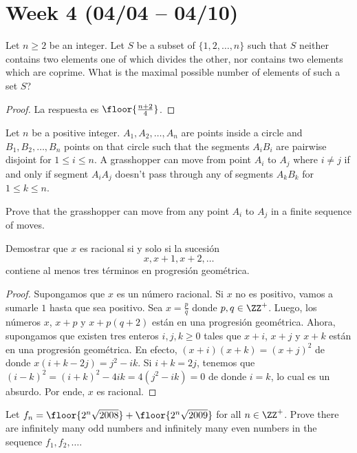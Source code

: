 \section{Week 4 (04/04 -- 04/10)}

\begin{probMR}[Balkan MO 2005/4]
	Let $n\ge 2$ be an integer. Let $S$ be a subset of $\{1,2,\dots,n\}$ such that $S$ neither contains two elements one of which divides the other, nor contains two elements which are coprime. What is the maximal possible number of elements of such a set $S$?
\end{probMR}

\begin{proof}
	La respuesta es $\floor{\frac{n+2}{4}}$.
\end{proof}

\begin{probMB}[Croatian MO 2018/5]
	Let $n$ be a positive integer. $A_1,A_2,\dots,A_n$ are points inside a circle and $B_1,B_2,\dots,B_n$ points on that circle such that the segments $A_iB_i$ are pairwise disjoint for $1\le i\le n$. A grasshopper can move from point $A_i$ to $A_j$ where $i\ne j$ if and only if segment $A_iA_j$ doesn't pass through any of segments $A_kB_k$ for $1\le k\le n$.

	Prove that the grasshopper can move from any point $A_i$ to $A_j$ in a finite sequence of moves.
\end{probMB}

\begin{probEG}
	Demostrar que $x$ es racional si y solo si la sucesión
	\[x,x+1,x+2,\dots\]
	contiene al menos tres términos en progresión geométrica.
\end{probEG}

\begin{proof}
	Supongamos que $x$ es un número racional. Si $x$ no es positivo, vamos a sumarle $1$ hasta que sea positivo. Sea $x=\frac pq$ donde $p,q\in\ZZ^+$. Luego, los números $x$, $x+p$ y $x+p(q+2)$ están en una progresión geométrica. Ahora, supongamos que existen tres enteros $i,j,k\ge 0$ tales que $x+i$, $x+j$ y $x+k$ están en una progresión geométrica. En efecto, $(x+i)(x+k)=(x+j)^2$ de donde $x(i+k-2j)=j^2-ik$. Si $i+k=2j$, tenemos que $(i-k)^2=(i+k)^2-4ik=4(j^2-ik)=0$ de donde $i=k$, lo cual es un absurdo. Por ende, $x$ es racional.
\end{proof}

\begin{probEG}[CGMO 2008/8]
	Let $f_n=\floor{2^n\sqrt{2008}}+\floor{2^n\sqrt{2009}}$ for all $n\in\ZZ^+$. Prove there are infinitely many odd numbers and infinitely many even numbers in the sequence $f_1,f_2,\dots$.
\end{probEG}

